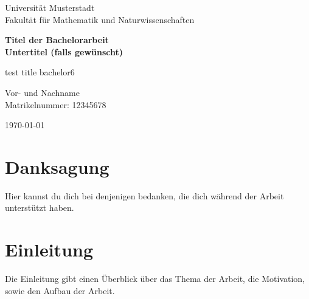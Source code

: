 \documentclass[12pt, reqno, titlepage]{amsart}
\begin{document}
\begin{titlepage}
    \centering
    \vspace*{1.5cm}
    
    {\Large Universität Musterstadt\\[0.3cm]
    Fakultät für Mathematik und Naturwissenschaften}
    
    \vspace{1.5cm}
    
    {\huge\bfseries Titel der Bachelorarbeit\\[0.4cm]
    \Large Untertitel (falls gewünscht)}
    
    \vspace{2cm}
    
    {\Large test title bachelor6}
    
    \vspace{2cm}
    
    {\Large Vor- und Nachname\\[0.2cm]
    Matrikelnummer: 12345678}
    
    \vfill
    
    {\Large \today}
    
\end{titlepage}






\begin{abstract}
    Hier folgt eine kurze Zusammenfassung der Arbeit. Erläutere in wenigen Sätzen das Thema, die Methodik und die wichtigsten Ergebnisse.
\end{abstract}
\thispagestyle{empty}
\newpage

\section*{Danksagung}
Hier kannst du dich bei denjenigen bedanken, die dich während der Arbeit unterstützt haben. 
\thispagestyle{empty}
\newpage

\tableofcontents
\thispagestyle{empty}
\newpage

\listoffigures
\thispagestyle{empty}
\newpage

\listoftables
\thispagestyle{empty}
\newpage

\section{Einleitung}
Die Einleitung gibt einen Überblick über das Thema der Arbeit, die Motivation, sowie den Aufbau der Arbeit.
\end{document}
